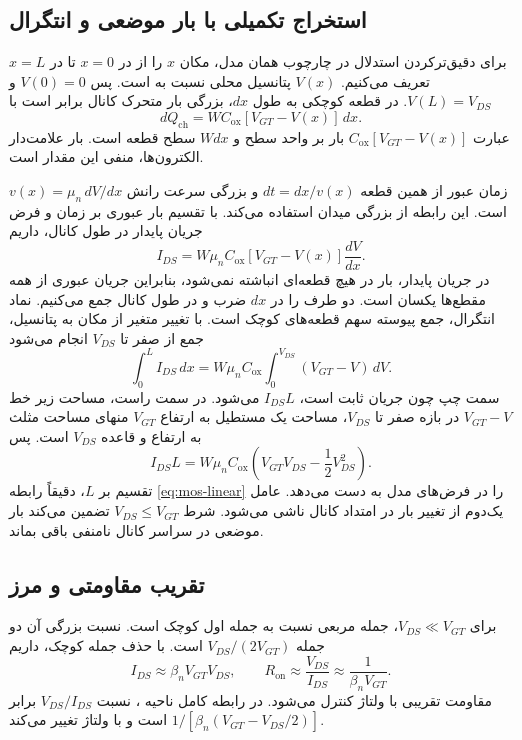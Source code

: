 \subsection{استخراج تکمیلی با بار موضعی و انتگرال}
برای دقیق‌ترکردن استدلال در چارچوب همان مدل، مکان \(x\) را از 
در \(x=0\) تا  در \(x=L\) تعریف می‌کنیم. \(V(x)\) پتانسیل محلی
نسبت به  است. پس \(V(0)=0\) و \(V(L)=V_{DS}\).
در قطعه کوچکی به طول \(dx\)، بزرگی بار متحرک کانال برابر است با
\begin{equation}
 dQ_{\mathrm{ch}}=W C_{\mathrm{ox}}[V_{GT}-V(x)]\,dx.
 \label{eq:mos-local-charge}
\end{equation}
عبارت \(C_{\mathrm{ox}}[V_{GT}-V(x)]\) بار بر واحد سطح و
\(Wdx\) سطح قطعه است. بار علامت‌دار الکترون‌ها، منفی این مقدار است.

زمان عبور از همین قطعه \(dt=dx/v(x)\) و بزرگی سرعت رانش
\(v(x)=\mu_n\,dV/dx\) است. این رابطه از بزرگی میدان استفاده می‌کند.
با تقسیم بار عبوری بر زمان و فرض جریان پایدار در طول کانال، داریم
\begin{equation}
 I_{DS}=W\mu_nC_{\mathrm{ox}}[V_{GT}-V(x)]\frac{dV}{dx}.
 \label{eq:mos-local-current}
\end{equation}
در جریان پایدار، بار در هیچ قطعه‌ای انباشته نمی‌شود، بنابراین جریان عبوری از
همه مقطع‌ها یکسان است. دو طرف را در \(dx\) ضرب و در طول کانال جمع می‌کنیم.
نماد انتگرال، جمع پیوسته سهم قطعه‌های کوچک است. با تغییر متغیر از مکان به
پتانسیل، جمع از صفر تا \(V_{DS}\) انجام می‌شود
\begin{equation*}
 \int_0^L I_{DS}\,dx
 =W\mu_nC_{\mathrm{ox}}\int_0^{V_{DS}}(V_{GT}-V)\,dV.
\end{equation*}
سمت چپ چون جریان ثابت است، \(I_{DS}L\) می‌شود. در سمت راست، مساحت زیر خط
\(V_{GT}-V\) در بازه صفر تا \(V_{DS}\)، مساحت یک مستطیل به ارتفاع \(V_{GT}\)
منهای مساحت مثلث به ارتفاع و قاعده \(V_{DS}\) است. پس
\begin{equation*}
 I_{DS}L=W\mu_n C_{\mathrm{ox}}
 \left(V_{GT}V_{DS}-\frac12V_{DS}^2\right).
\end{equation*}
تقسیم بر \(L\)، دقیقاً رابطه \eqref{eq:mos-linear} را در فرض‌های مدل به دست
می‌دهد. عامل یک‌دوم از تغییر بار در امتداد کانال ناشی می‌شود. شرط
\(V_{DS}\le V_{GT}\) تضمین می‌کند بار موضعی در سراسر کانال نامنفی باقی بماند.

\subsection{تقریب مقاومتی و مرز }
برای \(V_{DS}\ll V_{GT}\)، جمله مربعی نسبت به جمله اول کوچک است. نسبت بزرگی
آن دو جمله \(V_{DS}/(2V_{GT})\) است. با حذف جمله کوچک، داریم
\begin{equation}
 I_{DS}\approx\beta_nV_{GT}V_{DS},\qquad
 R_{\mathrm{on}}\approx\frac{V_{DS}}{I_{DS}}
 \approx\frac1{\beta_nV_{GT}}.
 \label{eq:mos-small-vds}
\end{equation}
مقاومت تقریبی با ولتاژ  کنترل می‌شود.
در رابطه کامل ناحیه ، نسبت \(V_{DS}/I_{DS}\) برابر
\(1/[\beta_n(V_{GT}-V_{DS}/2)]\) است و با ولتاژ تغییر می‌کند.

